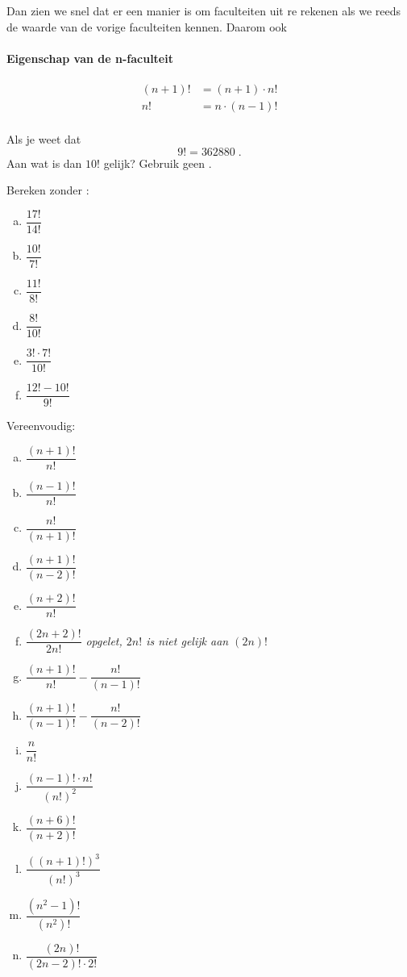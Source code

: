 \documentclass[12pt,a4,twoside]{article}
\begin{document}
Dan zien we snel dat er een manier is om faculteiten uit re rekenen als we reeds de waarde van de vorige faculteiten kennen. Daarom ook
\paragraph*{Eigenschap van de n-faculteit}
\begin{mdframed}
\begin{align*}
  (n+1)! &= (n+1) \cdot n!\\
  n!     &= n \cdot (n-1)!\\
\end{align*}
\end{mdframed}

\begin{oefening}
Als je weet dat
$$9!=362880\;.$$
Aan wat is dan $10!$ gelijk? Gebruik geen .
\end{oefening}

\begin{oefening}
Bereken zonder :
\begin{multicols}{3}
\begin{enumerate}[(a)]
  \itemsep.7em
  \item $\dfrac{17!}{14!}$
  \item $\dfrac{10!}{7!}$
  \item $\dfrac{11!}{8!}$
  \item $\dfrac{8!}{10!}$
  \item $\dfrac{3!\cdot 7!}{10!}$
  \item $\dfrac{12!-10!}{9!}$
\end{enumerate}
\end{multicols}
\end{oefening}

\begin{oefening}
Vereenvoudig:
\begin{multicols}{2}
\begin{enumerate}[(a)]
  \itemsep.7em
  \item $\dfrac{(n+1)!}{n!}$
  \item $\dfrac{(n-1)!}{n!}$
  \item $\dfrac{n!}{(n+1)!}$
  \item $\dfrac{(n+1)!}{(n-2)!}$
  \item $\dfrac{(n+2)!}{n!}$
  \item $\dfrac{(2n+2)!}{2n!}$ \hfill {\em\scriptsize opgelet, $2n!$ is niet gelijk aan $(2n)!$}
  \item $\dfrac{(n+1)!}{n!}-\dfrac{n!}{(n-1)!}$
  \item $\dfrac{(n+1)!}{(n-1)!}-\dfrac{n!}{(n-2)!}$
  \item $\dfrac{n}{n!}$
  \item $\dfrac{(n-1)!\cdot n!}{(n!)^2}$
  \item $\dfrac{(n+6)!}{(n+2)!}$
  \item $\dfrac{\left(\left(n+1\right)!\right)^3}{(n!)^3}$
  \item $\dfrac{(n^2-1)!}{(n^2)!}$
  \item $\dfrac{(2n)!}{(2n-2)!\cdot 2!}$
\end{enumerate}
\end{multicols}
\end{oefening}
\end{document}
